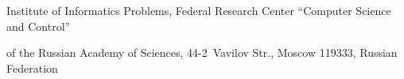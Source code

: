 \vspace*{-11pt}














\noindent


Institute of Informatics Problems, Federal Research Center ``Computer Science and Control''


 of the Russian Academy of Sciences, 44-2~Vavilov Str., Moscow 119333, Russian Federation





 


\def\leftfootline{\small{\textbf{\thepage}


\hfill INFORMATIKA I EE PRIMENENIYA~--- INFORMATICS AND


APPLICATIONS\ \ \ 2021\ \ \ volume~15\ \ \ issue\ 2}


}%


\def\rightfootline{\small{INFORMATIKA I EE PRIMENENIYA~---


INFORMATICS AND APPLICATIONS\ \ \ 2021\ \ \ volume~15\ \ \ issue\ 2


\hfill \textbf{\thepage}}}





\vspace*{3pt}











